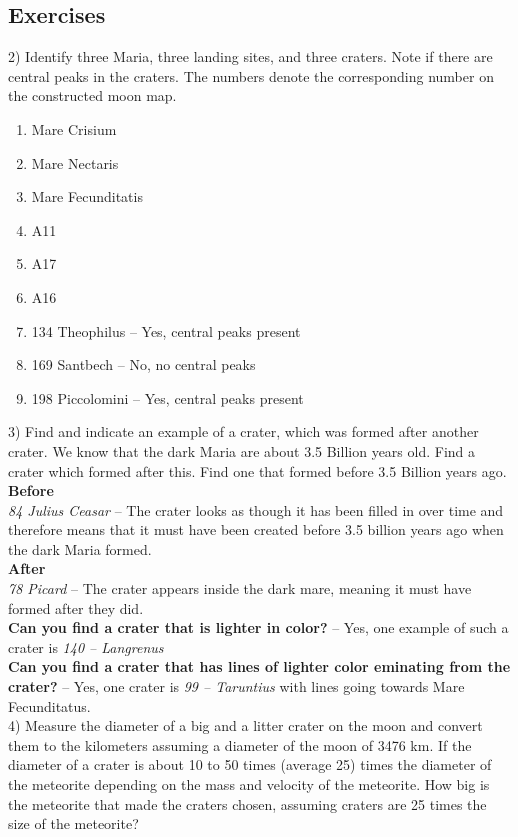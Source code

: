 \documentclass{article}
\begin{document}

\subsection{Exercises}
2) Identify three Maria, three landing sites, and three craters.  Note if there are central peaks in the craters.  The numbers denote the corresponding number on the constructed moon map.
\begin{enumerate}
	\item{Mare Crisium}
	\item{Mare Nectaris}
	\item{Mare Fecunditatis}
	\item{A11}
	\item{A17}
	\item{A16}
	\item{134 Theophilus -- Yes, central peaks present}
	\item{169 Santbech -- No, no central peaks}
	\item{198 Piccolomini -- Yes, central peaks present}
\end{enumerate}
3) Find and indicate an example of a crater, which was formed
after another crater. We know that the dark Maria are about 3.5 Billion
years old. Find a crater which formed after this. Find one that formed
before 3.5 Billion years ago.\\
\textbf{Before}\\
\emph{84 Julius Ceasar} -- The crater looks as though it has been filled in over time and therefore means that it must have been created before 3.5 billion years ago when the dark Maria formed.\\
\textbf{After}\\
\emph{78 Picard} -- The crater appears inside the dark mare, meaning it must have formed after they did.\\
\textbf{Can you find a crater that is lighter in color?} -- Yes, one example of such a crater is \emph{140 -- Langrenus}\\
\textbf{Can you find a crater that has lines of lighter color eminating from the crater?} -- Yes, one crater is \emph{99 -- Taruntius} with lines going towards Mare Fecunditatus.\\

4) Measure the diameter of a big and a litter crater on the moon and convert them to the kilometers assuming a diameter of the moon of 3476 km.  If the diameter of a crater is about 10 to 50 times (average 25) times the diameter of the meteorite depending on the mass and velocity of the meteorite.  How big is the meteorite that made the craters chosen, assuming craters are 25 times the size of the meteorite?
\end{document}
